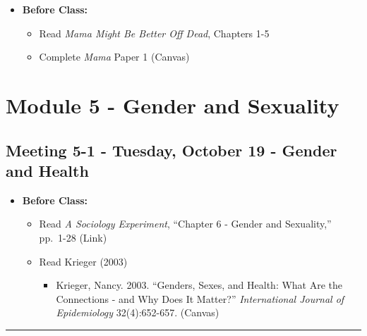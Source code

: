 \documentclass[
]{book}
\providecommand{\tightlist}{%
  \setlength{\itemsep}{0pt}\setlength{\parskip}{0pt}}
\begin{document}
\begin{itemize}
\tightlist
\item
  \textbf{Before Class:}

  \begin{itemize}
  \tightlist
  \item
    Read \emph{Mama Might Be Better Off Dead}, Chapters 1-5
  \item
    Complete \emph{Mama} Paper 1 (Canvas)
  \end{itemize}
\end{itemize}

\newpage

\hypertarget{module-5---gender-and-sexuality}{%
\section{Module 5 - Gender and Sexuality}\label{module-5---gender-and-sexuality}}

\hypertarget{meeting-5-1---tuesday-october-19---gender-and-health}{%
\subsection*{Meeting 5-1 - Tuesday, October 19 - Gender and Health}\label{meeting-5-1---tuesday-october-19---gender-and-health}}

\begin{itemize}
\tightlist
\item
  \textbf{Before Class:}

  \begin{itemize}
  \tightlist
  \item
    Read \emph{A Sociology Experiment}, ``Chapter 6 - Gender and Sexuality,'' pp.~1-28 (Link)
  \item
    Read Krieger (2003)

    \begin{itemize}
    \tightlist
    \item
      Krieger, Nancy. 2003. ``Genders, Sexes, and Health: What Are the Connections - and Why Does It Matter?'' \emph{International Journal of Epidemiology} 32(4):652-657. (Canvas)
    \end{itemize}
  \end{itemize}
\end{itemize}

\begin{center}\rule{0.5\linewidth}{0.5pt}\end{center}
\end{document}

